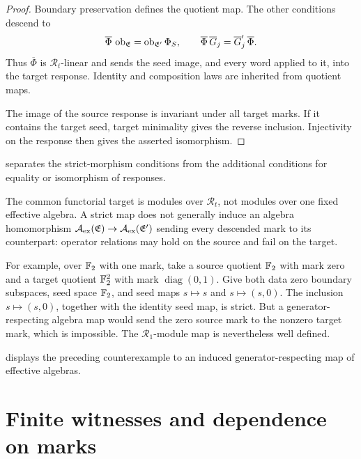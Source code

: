 \documentclass[11pt,a4paper]{article}
\begin{document}
\begin{proof}
Boundary preservation defines the quotient map.  The other conditions
descend to
\[
 \overline\Phi\,\operatorname{ob}_{\mathfrak E}
     =\operatorname{ob}_{\mathfrak E'}\Phi_S,\qquad
 \overline\Phi\,\overline G_j=\overline G'_j\,\overline\Phi.
\]
Thus $\overline\Phi$ is $\mathscr R_t$-linear and sends the seed image,
and every word applied to it, into the target response.  Identity and
composition laws are inherited from quotient maps.

The image of the source response is invariant under all target marks.
If it contains the target seed, target minimality gives the reverse
inclusion.  Injectivity on the response then gives the asserted
isomorphism.
\end{proof}

 separates the strict-morphism conditions from
the additional conditions for equality or isomorphism of responses.


\begin{remark}
\label{rem:effective}
The common functorial target is modules over $\mathscr R_t$, not modules
over one fixed effective algebra.  A strict map does not generally
induce an algebra homomorphism $\mathcal A_{\mathrm{ex}}(\mathfrak E)\to\mathcal A_{\mathrm{ex}}(\mathfrak E')$
sending every descended mark to its counterpart: operator relations may
hold on the source and fail on the target.

For example, over $\mathbb F_2$ with one mark, take a source quotient
$\mathbb F_2$ with mark zero and a target quotient $\mathbb F_2^2$ with mark
$\operatorname{diag}(0,1)$.  Give both data zero boundary subspaces,
seed space $\mathbb F_2$, and seed maps $s\mapsto s$ and $s\mapsto(s,0)$.
The inclusion $s\mapsto(s,0)$, together with the identity seed map, is
strict.  But a generator-respecting algebra map would send the zero
source mark to the nonzero target mark, which is impossible.  The
$\mathscr R_1$-module map is nevertheless well defined.
\end{remark}

 displays the preceding counterexample to an
induced generator-respecting map of effective algebras.


\section{Finite witnesses and dependence on marks}
\label{sec:examples}
\end{document}
